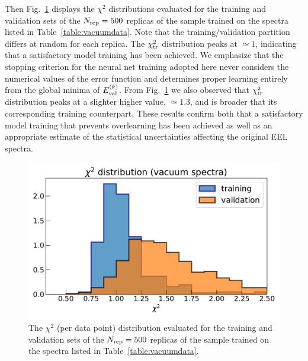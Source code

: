     Then Fig.~\ref{fig:chi2_distributions} displays  the $\chi^2$  distributions
    evaluated for the training and validation sets
      of the $N_{\rm rep}=500$ replicas of the sample trained on the spectra
      listed in Table~\ref{table:vacuumdata}.
      Note that the training/validation partition differs at random for each replica.
      The $\chi^2_{\rm tr}$ distribution peaks at $\simeq 1$, indicating that a satisfactory model training
      has been achieved.
      We emphasize that the stopping criterion for the neural net training adopted here never considers
      the numerical values of the error function and determines proper learning entirely from
      the global minima of $E_{\rm val}^{(k)}$.
      From Fig.~\ref{fig:chi2_distributions}  we also observed that  $\chi^2_{\rm tr}$ distribution peaks at
      a slighter higher value, $\simeq 1.3$, and is broader that its corresponding training counterpart.
      These results confirm both that a satisfactory model training that prevents overlearning
      has been achieved as well as an appropriate estimate of the statistical uncertainties
      affecting the original EEL spectra.
    
\begin{figure}[t]
    \centering
    \includegraphics[width=120mm]{plots/chi2_distributions.pdf}
    \caption{The $\chi^2$ (per data point) distribution evaluated for the training and validation sets
      of the $N_{\rm rep}=500$ replicas of the sample trained on the spectra
      listed in Table~\ref{table:vacuumdata}.}
    \label{fig:chi2_distributions}
\end{figure}

